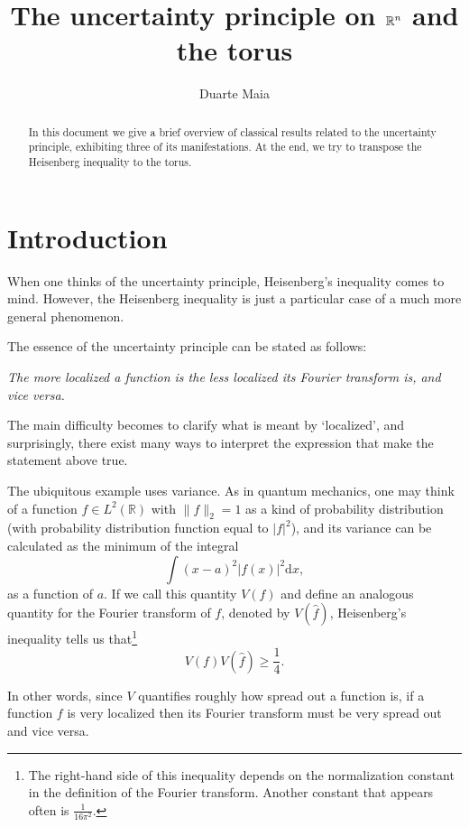 \documentclass{amsart}
\title{The uncertainty principle on $\R^n$ and the torus}
\author{Duarte Maia}
\date{}
\newcommand{\R}{\mathbb{R}}
\newcommand{\dd}{\mathrm{d}}
\begin{document}
\maketitle

\begin{abstract}
In this document we give a brief overview of classical results related to the uncertainty principle, exhibiting three of its manifestations. At the end, we try to transpose the Heisenberg inequality to the torus.
\end{abstract}

\section{Introduction}

When one thinks of the uncertainty principle, Heisenberg's inequality comes to mind. However, the Heisenberg inequality is just a particular case of a much more general phenomenon.

The essence of the uncertainty principle can be stated as follows:
\begin{center}
\emph{The more localized a function is the less localized its Fourier transform is, and vice versa.}
\end{center}

The main difficulty becomes to clarify what is meant by `localized', and surprisingly, there exist many ways to interpret the expression that make the statement above true.

The ubiquitous example uses variance. As in quantum mechanics, one may think of a function $f \in L^2(\R)$ with $\lVert f \rVert_2 = 1$ as a kind of probability distribution (with probability distribution function equal to $\lvert f \rvert^2$), and its variance can be calculated as the minimum of the integral
\[\int ( x - a )^2 \lvert f(x) \rvert^2 \dd x,\]
as a function of $a$. If we call this quantity $V(f)$ and define an analogous quantity for the Fourier transform of $f$, denoted by $V(\hat f)$, Heisenberg's inequality tells us that\footnote{The right-hand side of this inequality depends on the normalization constant in the definition of the Fourier transform. Another constant that appears often is $\frac1{16 \pi^2}$.}
\begin{equation}\label{heisenberg1}
V(f) V(\hat f) \geq \frac14.
\end{equation}

In other words, since $V$ quantifies roughly how spread out a function is, if a function $f$ is very localized then its Fourier transform must be very spread out and vice versa.
\end{document}
